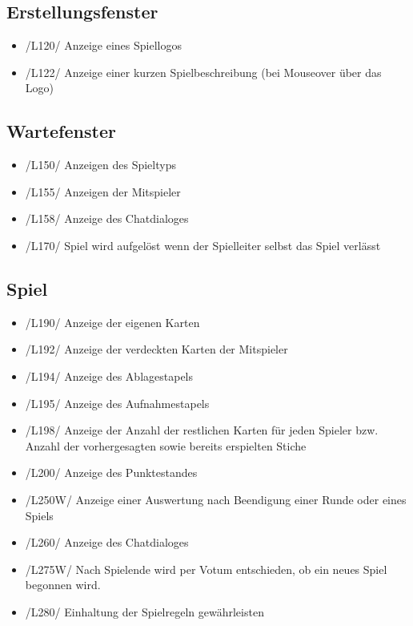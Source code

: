 \documentclass{article}
\begin{document}
\subsection{\gls{Erstellungsfenster}}
\begin{itemize}
	\item /L120/ Anzeige eines Spiellogos
	\item /L122/ Anzeige einer kurzen Spielbeschreibung (bei Mouseover über das Logo)
\end{itemize}

\subsection{\gls{Wartefenster}}
\begin{itemize}
	\item /L150/ Anzeigen des Spieltyps
	\item /L155/ Anzeigen der Mitspieler
	\item /L158/ Anzeige des Chatdialoges
	\item /L170/ Spiel wird aufgelöst wenn der \gls{Spielleiter} selbst das Spiel verlässt
\end{itemize}

\subsection{Spiel}
\begin{itemize}
	\item /L190/ Anzeige der eigenen Karten
	\item /L192/ Anzeige der verdeckten Karten der Mitspieler
	\item /L194/ Anzeige des Ablagestapels
	\item /L195/ Anzeige des Aufnahmestapels
	\item /L198/ Anzeige der Anzahl der restlichen Karten für jeden Spieler bzw. Anzahl der vorhergesagten sowie bereits erspielten Stiche
	\item /L200/ Anzeige des Punktestandes
	\item /L250W/ Anzeige einer Auswertung nach Beendigung einer Runde oder eines Spiels
	\item /L260/ Anzeige des Chatdialoges
	\item /L275W/ Nach Spielende wird per Votum entschieden, ob ein neues Spiel begonnen wird.
	\item /L280/ Einhaltung der Spielregeln gewährleisten
\end{itemize}
\end{document}

